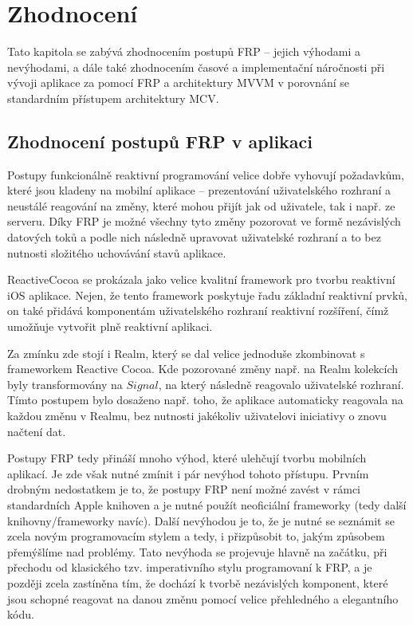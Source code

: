 \documentclass[thesis=M,czech]{FITthesis}[2012/06/26]
\begin{document}
\chapter{Zhodnocení}
Tato kapitola se zabývá zhodnocením postupů FRP -- jejich výhodami a nevýhodami, a dále také zhodnocením časové a implementační náročnosti při vývoji aplikace za pomocí FRP a architektury MVVM v porovnání se standardním přístupem architektury MCV.

\section{Zhodnocení postupů FRP v aplikaci}
Postupy funkcionálně reaktivní programování velice dobře  vyhovují požadavkům, které jsou kladeny na mobilní aplikace --  prezentování uživatelského rozhraní a neustálé reagování na změny, které mohou přijít jak od uživatele, tak i např. ze serveru. Díky FRP je možné všechny tyto změny pozorovat ve formě nezávislých datových toků a podle nich následně upravovat uživatelské rozhraní a to bez nutnosti složitého uchovávání stavů aplikace.

ReactiveCocoa se prokázala jako velice kvalitní framework pro tvorbu reaktivní iOS aplikace. Nejen, že tento framework poskytuje řadu základní reaktivní prvků, on také přidává komponentám uživatelského rozhraní reaktivní rozšíření, čímž umožňuje vytvořit plně reaktivní aplikaci.

Za zmínku zde stojí i Realm, který se dal velice jednoduše zkombinovat s frameworkem Reactive Cocoa. Kde pozorované změny např. na Realm kolekcích byly transformovány na $Signal$, na který následně reagovalo uživatelské rozhraní. Tímto postupem bylo dosaženo např. toho, že aplikace automaticky reagovala na každou změnu v Realmu, bez nutnosti jakékoliv uživatelovi iniciativy o znovu načtení dat.

Postupy FRP tedy přináší mnoho výhod, které ulehčují tvorbu mobilních aplikací. Je zde však nutné zmínit i pár nevýhod tohoto přístupu. Prvním drobným nedostatkem je to, že postupy FRP není možné zavést v rámci standardních Apple knihoven a je nutné použít neoficiální frameworky (tedy další knihovny/frameworky navíc). Další nevýhodou je to, že je nutné se seznámit se zcela novým programovacím stylem a tedy, i přizpůsobit to, jakým způsobem přemýšlíme nad problémy. Tato nevýhoda se projevuje hlavně na začátku, při přechodu od klasického tzv. imperativního stylu programovaní k FRP, a je později zcela zastíněna tím, že dochází k tvorbě nezávislých komponent, které jsou schopné reagovat na danou změnu pomocí velice přehledného a elegantního kódu.
\end{document}
